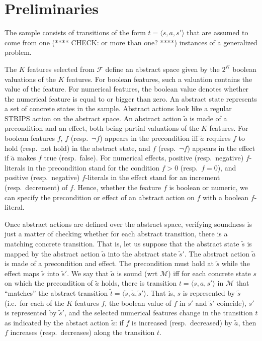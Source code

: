 \documentclass[10pt]{article}
\newcommand{\tup}[1]{\langle #1 \rangle}
\newcommand{\F}{\mathcal{F}}
\newcommand{\M}{\mathcal{M}}
\begin{document}
\section{Preliminaries}

The sample consists of transitions of the form $t=\tup{s,a,s'}$ that
are assumed to come from one (**** CHECK: or more than one? ****) instances
of a generalized problem.

The $K$ features selected from $\F$ define an abstract space given by the
$2^K$ boolean valuations of the $K$ features. For boolean features, such a
valuation contains the value of the feature. For numerical features, the
boolean value denotes whether the numerical feature is equal to or bigger
than zero.
An abstract state represents a set of concrete states in the sample.
Abstract actions look like a regular STRIPS action on the abstract space.
An abstract action $\tilde a$ is made of a precondition and an effect, both
being partial valuations of the $K$ features. For boolean features $f$, $f$
(resp.\ $\neg f$) appears in the precondition iff $\tilde a$ requires $f$
to hold (resp.\ not hold) in the abstract state, and $f$ (resp.\ $\neg f$)
appears in the effect if $\tilde a$ makes $f$ true (resp.\ false).
For numerical effects, positive (resp.\ negative) $f$-literals in the
precondition stand for the condition $f>0$ (resp.\ $f=0$), and positive
(resp.\ negative) $f$-literals in the effect stand for an increment
(resp.\ decrement) of $f$.
Hence, whether the feature $f$ is boolean or numeric, we can specify
the precondition or effect of an abstract action on $f$ with a boolean
$f$-literal.

Once abstract actions are defined over the abstract space, verifying
soundness is just a matter of checking whether for each abstract
transition, there is a matching concrete transition.
That is, let us suppose that the abstract state $\tilde s$ is mapped
by the abstract action $\tilde a$ into the abstract state $\tilde s'$.
The abstract action $\tilde a$ is made of a precondition and effect.
The precondition must hold at $\tilde s$ while the effect maps $\tilde s$
into $\tilde s'$.
We say that $\tilde a$ is sound (wrt $\M$) iff for each concrete state
$s$ on which the precondition of $\tilde a$ holds, there is transition
$t=\tup{s,a,s'}$ in $\M$ that ``matches'' the abstract transition
$\tilde t=\tup{\tilde s,\tilde a,\tilde s'}$.
That is, $s$ is represented by $\tilde s$ (i.e.\ for each of the $K$
features $f$, the boolean value of $f$ in $s'$ and $\tilde s'$ coincide),
$s'$ is represented by $\tilde s'$, and the selected numerical features
change in the transition $t$ as indicated by the abstact action
$\tilde a$: if $f$ is increased (resp.\ decreased) by $\tilde a$,
then $f$ increases (resp.\ decreases) along the transition $t$.
\end{document}
